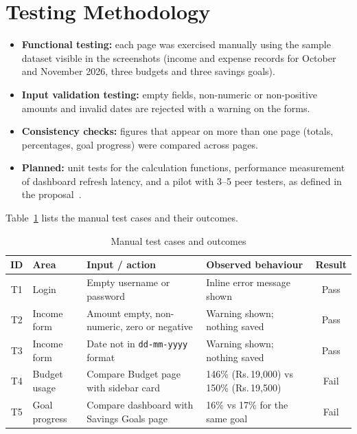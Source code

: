 \documentclass{tietreport}
\begin{document}
\section{Testing Methodology}

\begin{itemize}
  \item \textbf{Functional testing:} each page was exercised
    manually using the sample dataset visible in the screenshots
    (income and expense records for October and November 2026,
    three budgets and three savings goals).
  \item \textbf{Input validation testing:} empty fields, non-numeric
    or non-positive amounts and invalid dates are rejected with a
    warning on the forms.
  \item \textbf{Consistency checks:} figures that appear on more
    than one page (totals, percentages, goal progress) were
    compared across pages.
  \item \textbf{Planned:} unit tests for the calculation functions,
    performance measurement of dashboard refresh latency, and a
    pilot with 3--5 peer testers, as defined in the
    proposal~\cite{pfmproposal}.
\end{itemize}

Table~\ref{tab:testcases} lists the manual test cases and their
outcomes.

\begin{table}[htbp]
\centering
\small
\begin{tabularx}{\textwidth}{|c|l|X|X|c|}
  \hline
  \textbf{ID} & \textbf{Area} & \textbf{Input / action} &
  \textbf{Observed behaviour} & \textbf{Result} \\
  \hline
  T1 & Login & Empty username or password &
    Inline error message shown & Pass \\
  \hline
  T2 & Income form & Amount empty, non-numeric, zero or negative &
    Warning shown; nothing saved & Pass \\
  \hline
  T3 & Income form & Date not in \texttt{dd-mm-yyyy} format &
    Warning shown; nothing saved & Pass \\
  \hline
  T4 & Budget usage & Compare Budget page with sidebar card &
    146\% (Rs.\,19,000) vs 150\% (Rs.\,19,500) & Fail \\
  \hline
  T5 & Goal progress & Compare dashboard with Savings Goals page &
    16\% vs 17\% for the same goal & Fail \\
  \hline
\end{tabularx}
\caption{Manual test cases and outcomes}
\label{tab:testcases}
\end{table}
\end{document}

